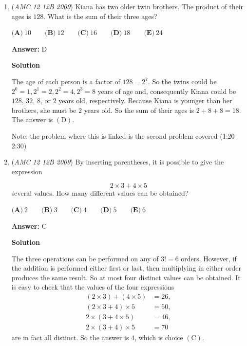 \begin{enumerate}
 


	\item (\textit{AMC 12 12B 2009}) Kiana has two older twin brothers. The product of their ages is $128$. What is the sum of their three ages?


 $\textbf{(A)}\ 10\qquad \textbf{(B)}\ 12\qquad \textbf{(C)}\ 16\qquad \textbf{(D)}\ 18\qquad \textbf{(E)}\ 24$

 \textbf{Answer: }D



\textbf{Solution}

The age of each person is a factor of $128 = 2^7$.  So the twins could be $2^0 = 1, 2^1 = 2, 2^2 = 4, 2^3 = 8$ years of age and, consequently Kiana could be $128$, $32$, $8$, or $2$ years old, respectively.  Because Kiana is younger than her brothers, she must be $2$ years old. So the sum of their ages is $2 + 8 + 8 = \boxed{18}$.  The answer is $\mathrm{(D)}$.

 Note: the problem where this is linked is the second problem covered (1:20-2:30)

 


	\item (\textit{AMC 12 12B 2009}) By inserting parentheses, it is possible to give the expression

 \[2\times3 + 4\times5\]
several values. How many different values can be obtained?


 $\textbf{(A)}\ 2\qquad \textbf{(B)}\ 3\qquad \textbf{(C)}\ 4\qquad \textbf{(D)}\ 5\qquad \textbf{(E)}\ 6$

 \textbf{Answer: }C



\textbf{Solution}

The three operations can be performed on any of $3! = 6$ orders.  However, if the addition is performed either first or last, then multiplying in either order produces the same result. So at most four distinct values can be obtained.  It is easy to check that the values of the four expressions
 \begin{align*} (2\times3) + (4\times5) &= 26,\\ (2\times3 + 4)\times5 &= 50,\\ 2\times(3 + 4\times5) &= 46,\\ 2\times(3 + 4)\times5 &= 70 \end{align*}
are in fact all distinct.  So the answer is $\boxed{4}$, which is choice $\mathrm{(C)}$.

 




\end{enumerate}
